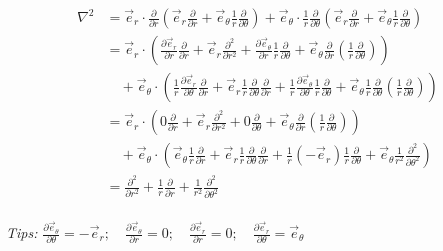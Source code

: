 \begin{frame}
	\[ \begin{aligned}
	\nabla ^2 &= \vec{e}_r \cdot\frac{\partial }{\partial r}  (\vec{e}_r \frac{\partial }{\partial r} +   \vec{e}_\theta \frac{1}{r} \frac{\partial }{\partial \theta})+  \vec{e}_\theta \cdot \frac{1}{r} \frac{\partial }{\partial \theta} (\vec{e}_r \frac{\partial }{\partial r} +   \vec{e}_\theta \frac{1}{r} \frac{\partial }{\partial \theta})\\
	&=\vec{e}_r \cdot (\frac{\partial \vec{e}_r}{\partial r} \frac{\partial }{\partial r} + \vec{e}_r \frac{\partial ^2 }{\partial r ^2}+  \frac{\partial \vec{e}_\theta}{\partial r} \frac{1}{r}\frac{\partial }{\partial \theta}+  \vec{e}_\theta\frac{\partial }{\partial r} (\frac{1}{r}\frac{\partial }{\partial \theta})) \\
	&\hspace{1em} + \vec{e}_\theta \cdot (\frac{1}{r}\frac{\partial \vec{e}_r}{\partial \theta} \frac{\partial }{\partial r} + \vec{e}_r \frac{1}{r} \frac{\partial }{\partial \theta} \frac{\partial }{\partial r} + \frac{1}{r} \frac{\partial  \vec{e}_\theta}{\partial \theta} \frac{1}{r} \frac{\partial }{\partial \theta} + \vec{e}_\theta \frac{1}{r} \frac{\partial }{\partial \theta} (\frac{1}{r} \frac{\partial }{\partial \theta} )
	) \\
	&=\vec{e}_r \cdot (0 \frac{\partial }{\partial r} + \vec{e}_r \frac{\partial ^2 }{\partial r ^2}+  0\frac{\partial }{\partial \theta}+  \vec{e}_\theta\frac{\partial }{\partial r} (\frac{1}{r}\frac{\partial }{\partial \theta})) \\
	&\hspace{1em} + \vec{e}_\theta \cdot (\vec{e}_\theta \frac{1}{r}\frac{\partial }{\partial r} + \vec{e}_r \frac{1}{r} \frac{\partial }{\partial \theta} \frac{\partial }{\partial r} + \frac{1}{r} (-\vec{e}_r) \frac{1}{r} \frac{\partial }{\partial \theta} + \vec{e}_\theta \frac{1}{r^2} \frac{\partial ^2 }{\partial \theta ^2}
	) \\
	&=  \frac{\partial^2  }{\partial r^2 } +\frac{1}{r } \frac{\partial  }{\partial r } +\frac{1}{r^2 } \frac{\partial ^2  }{\partial \theta ^2} 
	\end{aligned}\] 
~\\ \vspace{1em}
\alert{\textit{Tips:\hspace{1em}}} $\frac{\partial  \vec{e}_\theta}{\partial \theta}=-\vec{e}_r ;\quad \frac{\partial  \vec{e}_\theta}{\partial r}=0 ;  \quad \frac{\partial  \vec{e}_r}{\partial r}=0 ; \quad\frac{\partial  \vec{e}_r}{\partial \theta}=\vec{e}_\theta $ 
\end{frame}


